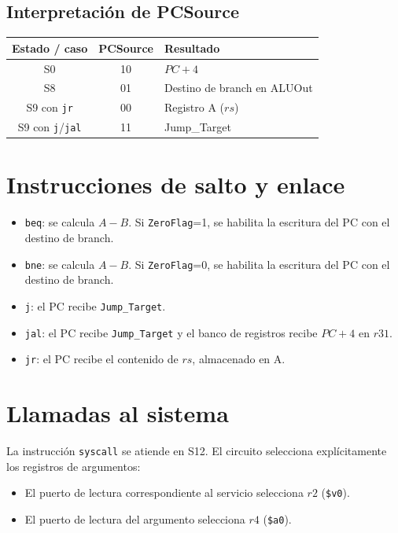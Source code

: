 \documentclass[11pt,a4paper]{article}
\begin{document}
\subsection{Interpretación de PCSource}

\begin{center}
    \begin{tabular}{ccl}
        \toprule
        \textbf{Estado / caso} & \textbf{PCSource} & \textbf{Resultado} \\
        \midrule
        S0 & 10 & $PC+4$ \\
        S8 & 01 & Destino de branch en ALUOut \\
        S9 con \texttt{jr} & 00 & Registro A ($rs$) \\
        S9 con \texttt{j}/\texttt{jal} & 11 & Jump\_Target \\
        \bottomrule
    \end{tabular}
\end{center}

\section{Instrucciones de salto y enlace}

\begin{itemize}
    \item \texttt{beq}: se calcula $A-B$. Si \texttt{ZeroFlag}=1, se habilita la escritura del PC con el destino de branch.
    \item \texttt{bne}: se calcula $A-B$. Si \texttt{ZeroFlag}=0, se habilita la escritura del PC con el destino de branch.
    \item \texttt{j}: el PC recibe \texttt{Jump\_Target}.
    \item \texttt{jal}: el PC recibe \texttt{Jump\_Target} y el banco de registros recibe $PC+4$ en $r31$.
    \item \texttt{jr}: el PC recibe el contenido de $rs$, almacenado en A.
\end{itemize}

\section{Llamadas al sistema}

La instrucción \texttt{syscall} se atiende en S12. El circuito selecciona explícitamente los registros de argumentos:
\begin{itemize}
    \item El puerto de lectura correspondiente al servicio selecciona $r2$ (\texttt{\$v0}).
    \item El puerto de lectura del argumento selecciona $r4$ (\texttt{\$a0}).
\end{itemize}
\end{document}
